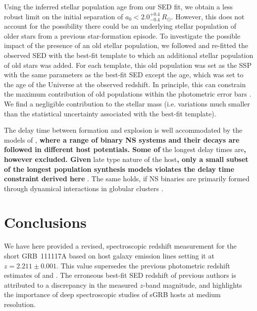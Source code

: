 \documentclass[referee]{aa}
\providecommand{\DIFaddtex}[1]{{\bf #1}} %
\providecommand{\DIFdeltex}[1]{} %
\providecommand{\DIFaddbegin}{} %
\providecommand{\DIFaddend}{} %
\providecommand{\DIFdelbegin}{} %
\providecommand{\DIFdelend}{} %
\providecommand{\DIFadd}[1]{\texorpdfstring{\DIFaddtex{#1}}{#1}} %
\providecommand{\DIFdel}[1]{\texorpdfstring{\DIFdeltex{#1}}{}} %
\newcommand{\DIFscaledelfig}{0.5}
\newlength{\DIFdelgraphicswidth} %
\newlength{\DIFdelgraphicsheight} %
\newcommand{\DIFaddincludegraphics}[2][]{{\color{blue}\fbox{\DIFOincludegraphics[#1]{#2}}}} %
\newcommand{\DIFdelincludegraphics}[2][]{%
\sbox{\DIFdelgraphicsbox}{\DIFOincludegraphics[#1]{#2}}%
\settoboxwidth{\DIFdelgraphicswidth}{\DIFdelgraphicsbox} %
\settoboxtotalheight{\DIFdelgraphicsheight}{\DIFdelgraphicsbox} %
\scalebox{\DIFscaledelfig}{%
\parbox[b]{\DIFdelgraphicswidth}{\usebox{\DIFdelgraphicsbox}\\[-\baselineskip] \rule{\DIFdelgraphicswidth}{0em}}\llap{\resizebox{\DIFdelgraphicswidth}{\DIFdelgraphicsheight}{%
\setlength{\unitlength}{\DIFdelgraphicswidth}%
\begin{picture}(1,1)%
\thicklines\linethickness{2pt} %
{\color[rgb]{1,0,0}\put(0,0){\framebox(1,1){}}}%
{\color[rgb]{1,0,0}\put(0,0){\line( 1,1){1}}}%
{\color[rgb]{1,0,0}\put(0,1){\line(1,-1){1}}}%
\end{picture}%
}\hspace*{3pt}}} %
} %
\DeclareRobustCommand{\DIFaddbegin}{\DIFOaddbegin \let\includegraphics\DIFaddincludegraphics} %
\DeclareRobustCommand{\DIFaddend}{\DIFOaddend \let\includegraphics\DIFOincludegraphics} %
\DeclareRobustCommand{\DIFdelbegin}{\DIFOdelbegin \let\includegraphics\DIFdelincludegraphics} %
\DeclareRobustCommand{\DIFdelend}{\DIFOaddend \let\includegraphics\DIFOincludegraphics} %
\begin{document}
Using the inferred stellar population age from our SED fit, we obtain a less
robust limit on the initial separation of $a_0 < 2.0^{+0.4}_{-0.4}~R_\odot$.
However, this does not account for the possibility there could be an underlying
stellar population of older stars from a previous star-formation episode. To
investigate the possible impact of the presence of an old stellar population, we
followed \citet{Papovich2001} and re-fitted the observed SED with the best-fit
template to which an additional stellar population of old stars was added. For
each template, this old population was set as the SSP with the same parameters as
the best-fit SED except the age, which was set to the age of the Universe at
the observed redshift. In principle, this can constrain the maximum contribution
of old populations within the photometric error bars \citep[see][for
details]{Papovich2001}. We find a negligible contribution to the stellar mass
(i.e. variations much smaller than the statistical uncertainty associated with
the best-fit template).

The delay time between formation and explosion is well accommodated by the
models of \citet{Belczynski2006}, \DIFdelbegin \DIFdel{although }\DIFdelend \DIFaddbegin \DIFadd{where a range of binary NS systems and their
decays are followed in different host potentials.  Some of }\DIFaddend the longest delay
times are\DIFdelbegin \DIFdel{excluded.
This is especially true given the }\DIFdelend \DIFaddbegin \DIFadd{, however excluded. Given }\DIFaddend late type nature of the host\DIFaddbegin \DIFadd{, only a small
subset of the longest population synthesis models violates the delay time
constraint derived here }\DIFaddend \citep{OShaughnessy2008}. The same holds, if NS binaries
are primarily formed through dynamical interactions in globular clusters
\citep{Lee2010, Church2011}.

\section{Conclusions}

We have here provided a revised, spectroscopic redshift measurement for the
short GRB~111117A based on host galaxy emission lines setting it at $z = 2.211
\pm 0.001$. This value supersedes the previous photometric redshift estimates of
\citet{Margutti2012} and \citet{Sakamoto2013}. The erroneous best-fit SED
redshift of previous authors is attributed to a discrepancy in the measured
$z$-band magnitude, and highlights the importance of deep spectroscopic studies
of sGRB hosts at medium resolution.
\end{document}
